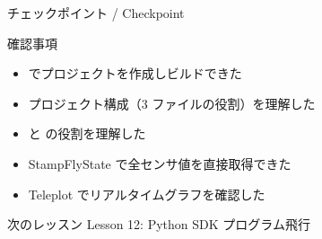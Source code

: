 \begin{frame}{チェックポイント / Checkpoint}
  \begin{alertblock}{確認事項}
    \begin{itemize}
      \item[$\square$]  でプロジェクトを作成しビルドできた
      \item[$\square$] プロジェクト構成（3 ファイルの役割）を理解した
      \item[$\square$]  と  の役割を理解した
      \item[$\square$] StampFlyState で全センサ値を直接取得できた
      \item[$\square$] Teleplot でリアルタイムグラフを確認した
    \end{itemize}
  \end{alertblock}

  \vspace{0.5em}

  \begin{block}{次のレッスン}
    Lesson 12: Python SDK プログラム飛行
  \end{block}
\end{frame}
